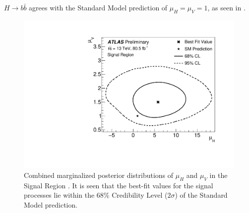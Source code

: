 $H \rightarrow b\bar{b}$ agrees with the Standard Model prediction of $\mu_{H}
= \mu_{V} = 1$, as seen in .
%
\begin{figure}[!b]
\centering
\includegraphics[width=.7\linewidth]{figures/results/contour}
\caption{
Combined marginalized posterior distributions of $\mu_{H}$ and $\mu_{V}$ in the
Signal Region \cite{ATLAS-CONF-2018-052}.  It is seen that the best-fit values for the signal processes
lie within the 68\% Credibility Level ($2\sigma$) of the Standard Model
prediction.}
\label{sec:results:contour}
\end{figure}
